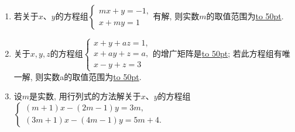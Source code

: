 \documentclass[10pt,a4paper]{article}
\newcommand{\blank}[1]{\underline{\hbox to #1pt{}}}
\begin{document}
\begin{enumerate}[1.]
\item 若关于$x$、$y$的方程组$\begin{cases} mx+y=-1,\\ x+my=1 \end{cases}$有解, 则实数$m$的取值范围为\blank{50}.
\item 关于$x,y,z$的方程组$\begin{cases} x+y+az=1, \\ x+ay+z=a, \\ x-y+z=3 \end{cases}$的增广矩阵是\blank{50}; 若此方程组有唯一解, 则实数a的取值范围为\blank{50}.
\item 设$m$是实数, 用行列式的方法解关于$x$、$y$的方程组$\begin{cases} (m+1)x-(2m-1)y=3m, \\ (3m+1)x-(4m-1)y=5m+4. \end{cases}$


\end{enumerate}
\end{document}
